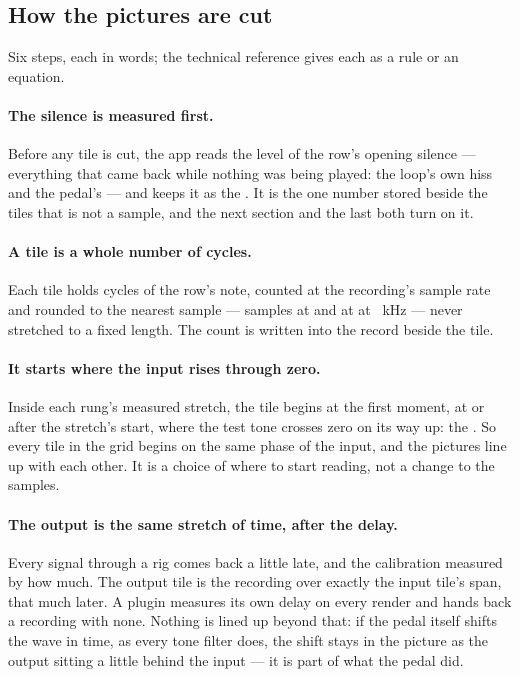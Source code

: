 \documentclass[11pt,a4paper]{article}
\begin{document}
\subsection{How the pictures are cut}

Six steps, each in words; the technical reference gives each as a rule
or an equation.

\paragraph{The silence is measured first.} Before any tile is cut, the
app reads the level of the row's opening silence --- everything that came
back while nothing was being played: the loop's own hiss and the pedal's
--- and keeps it as the . It is the one number
stored beside the tiles that is not a sample, and the next section and
the last both turn on it.

\paragraph{A tile is a whole number of cycles.} Each tile holds
\wmPeriodCount{} cycles of the row's note, counted at the recording's
sample rate and rounded to the nearest sample --- \wmTileSamplesLow{}
samples at \wmLowNote{} and \wmTileSamplesHigh{} at \wmHighNote{} at
\wmSampleRateKHz{}~kHz --- never stretched to a fixed length. The count is
written into the record beside the tile.

\paragraph{It starts where the input rises through zero.} Inside each
rung's measured stretch, the tile begins at the first moment, at or after
the stretch's start, where the test tone crosses zero on its way up: the
. So every tile in the grid begins on the same
phase of the input, and the pictures line up with each other. It is a
choice of where to start reading, not a change to the samples.

\paragraph{The output is the same stretch of time, after the delay.}
Every signal through a rig comes back a little late, and the calibration
measured by how much. The output tile is the recording over exactly the
input tile's span, that much later. A plugin measures its own delay on
every render and hands back a recording with none. Nothing is lined up
beyond that: if the pedal itself shifts the wave in time, as every tone
filter does, the shift stays in the picture as the output sitting a
little behind the input --- it is part of what the pedal did.
\end{document}
